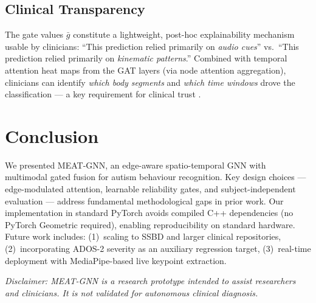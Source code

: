 \documentclass[conference]{IEEEtran}
\begin{document}
\subsection{Clinical Transparency}

The gate values $\bar{g}$ constitute a lightweight, post-hoc explainability mechanism 
usable by clinicians: ``This prediction relied primarily on \textit{audio cues}'' 
vs.\ ``This prediction relied primarily on \textit{kinematic patterns}.'' 
Combined with temporal attention heat maps from the GAT layers (via node attention 
aggregation), clinicians can identify \textit{which body segments} and 
\textit{which time windows} drove the classification — a key requirement for 
clinical trust \cite{Reyes2020}.

\section{Conclusion}

We presented MEAT-GNN, an edge-aware spatio-temporal GNN with multimodal gated fusion 
for autism behaviour recognition. Key design choices — edge-modulated attention, 
learnable reliability gates, and subject-independent evaluation — address fundamental 
methodological gaps in prior work. Our implementation in standard PyTorch avoids 
compiled C++ dependencies (no PyTorch Geometric required), enabling reproducibility 
on standard hardware. Future work includes: (1)~scaling to SSBD and larger clinical 
repositories, (2)~incorporating ADOS-2 severity as an auxiliary regression target, 
(3)~real-time deployment with MediaPipe-based live keypoint extraction.

\textit{Disclaimer: MEAT-GNN is a research prototype intended to assist researchers 
and clinicians. It is not validated for autonomous clinical diagnosis.}



\end{document}
